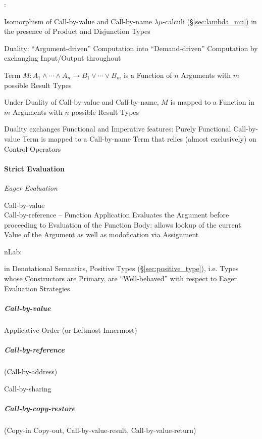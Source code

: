 \cite{selinger01}:

Isomorphism of Call-by-value and Call-by-name $\lambda\mu$-calculi
(\S\ref{sec:lambda_mu}) in the presence of Product and Disjunction
Types

Duality: ``Argument-driven'' Computation into ``Demand-driven''
Computation by exchanging Input/Output throughout

Term $M : A_1 \wedge \cdots \wedge A_n \rightarrow B_1 \vee \cdots
\vee B_m$ is a Function of $n$ Arguments with $m$ possible Result
Types

Under Duality of Call-by-value and Call-by-name, $M$ is mapped to a
Function in $m$ Arguments with $n$ possible Result Types

Duality exchanges Functional and Imperative features: Purely
Functional Call-by-value Term is mapped to a Call-by-name Term that
relies (almost exclusively) on Control Operators %



\paragraph{Strict Evaluation}\label{sec:strict_evaluation}\hfill

\emph{Eager Evaluation}

Call-by-value \\
Call-by-reference -- Function Application Evaluates the Argument
before proceeding to Evaluation of the Function Body: allows lookup of
the current Value of the Argument as well as modofication via
Assignment

nLab:

in Denotational Semantics, Positive Types (\S\ref{sec:positive_type}),
i.e. Types whose Constructors are Primary, are ``Well-behaved'' with
respect to Eager Evaluation Strategies



\subparagraph{Call-by-value}\label{sec:call_by_value}\hfill

Applicative Order (or Leftmost Innermost)



\subparagraph{Call-by-reference}\label{sec:call_by_reference}\hfill

(Call-by-address)

Call-by-sharing



\subparagraph{Call-by-copy-restore}\label{sec:call_by_copy_restore}\hfill

(Copy-in Copy-out, Call-by-value-result, Call-by-value-return)

